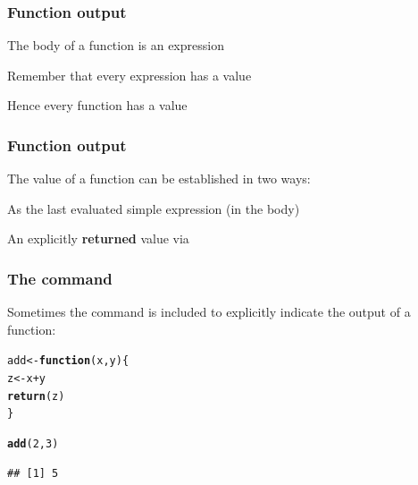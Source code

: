 \documentclass[12pt]{beamer}\usepackage[]{graphicx}\usepackage[]{color}
\makeatletter
\newcommand{\hlnum}[1]{\textcolor[rgb]{0.686,0.059,0.569}{#1}}%
\newcommand{\hlopt}[1]{\textcolor[rgb]{0,0,0}{#1}}%
\newcommand{\hlstd}[1]{\textcolor[rgb]{0.345,0.345,0.345}{#1}}%
\newcommand{\hlkwa}[1]{\textcolor[rgb]{0.161,0.373,0.58}{\textbf{#1}}}%
\newcommand{\hlkwb}[1]{\textcolor[rgb]{0.69,0.353,0.396}{#1}}%
\newcommand{\hlkwc}[1]{\textcolor[rgb]{0.333,0.667,0.333}{#1}}%
\newcommand{\hlkwd}[1]{\textcolor[rgb]{0.737,0.353,0.396}{\textbf{#1}}}%
\newenvironment{kframe}{%
 \def\at@end@of@kframe{}%
 \ifinner\ifhmode%
  \def\at@end@of@kframe{\end{minipage}}%
  \begin{minipage}{\columnwidth}%
 \fi\fi%
 \def\FrameCommand##1{\hskip\@totalleftmargin \hskip-\fboxsep
 \colorbox{shadecolor}{##1}\hskip-\fboxsep
     \hskip-\linewidth \hskip-\@totalleftmargin \hskip\columnwidth}%
 \MakeFramed {\advance\hsize-\width
   \@totalleftmargin\z@ \linewidth\hsize
   \@setminipage}}%
 {\par\unskip\endMakeFramed%
 \at@end@of@kframe}
\newenvironment{knitrout}{}{} %
\makeatother
\begin{document}

\begin{frame}
\begin{center}
\Huge{}
\end{center}
\end{frame}


\begin{frame}
\frametitle{Function output}

\bbi
  \item The body of a function is an expression
  \item Remember that every expression has a value
  \item Hence every function has a value
\ei

\end{frame}


\begin{frame}
\frametitle{Function output}

The value of a function can be established in two ways:
\bi
  \item As the last evaluated simple expression (in the body)
  \item An explicitly \textbf{returned} value via {\hilit {}}
\ei

\end{frame}


\begin{frame}[fragile]
\frametitle{The  command}

Sometimes the  command is included to explicitly indicate the output of a function:

\begin{knitrout}\footnotesize
{}\color{fgcolor}\begin{kframe}
\begin{alltt}
\hlstd{add} \hlkwb{<-} \hlkwa{function}\hlstd{(}\hlkwc{x}\hlstd{,} \hlkwc{y}\hlstd{) \{}
  \hlstd{z} \hlkwb{<-} \hlstd{x} \hlopt{+} \hlstd{y}
  \hlkwd{return}\hlstd{(z)}
\hlstd{\}}

\hlkwd{add}\hlstd{(}\hlnum{2}\hlstd{,} \hlnum{3}\hlstd{)}
\end{alltt}
\begin{verbatim}
## [1] 5
\end{verbatim}
\end{kframe}
\end{knitrout}

\end{frame}
\end{document}
